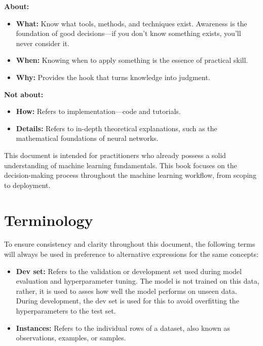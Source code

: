 \documentclass[12pt,openany]{book}
\begin{document}
\vspace{1em}
\textbf{About:}

\begin{itemize}
    \item \textcolor{green!50!black}{\textbf{What:}} Know what tools, methods, and techniques exist. Awareness is the foundation of good decisions—if you don’t know something exists, you’ll never consider it.
    \item \textcolor{green!50!black}{\textbf{When:}} Knowing when to apply something is the essence of practical skill.
    \item \textcolor{green!50!black}{\textbf{Why:}} Provides the hook that turns knowledge into judgment.
\end{itemize}

\vspace{1em}
\textbf{Not about:}

\begin{itemize}
    \item \textcolor{red!70!black}{\textbf{How:}} Refers to implementation—code and tutorials.
    \item \textcolor{red!70!black}{\textbf{Details:}} Refers to in-depth theoretical explanations, such as the mathematical foundations of neural networks.
\end{itemize}


This document is intended for practitioners who already possess a 
solid understanding of machine learning fundamentals. This book focuses on the decision-making process throughout the machine learning workflow, from scoping to deployment.



\section{Terminology}

To ensure consistency and clarity throughout this document, the following terms will always be used in preference to alternative expressions for the same concepts:

\begin{itemize}
    \item \textbf{Dev set:} Refers to the validation or development set used during model evaluation and hyperparameter tuning. The model is not trained on this data, rather, it is used to asses how well the model performs on unseen data. During development, the dev set is used for this to avoid overfitting the hyperparameters to the test set.
    \item \textbf{Instances:} Refers to the individual rows of a dataset, also known as observations, examples, or samples. 
\end{itemize}
\end{document}
